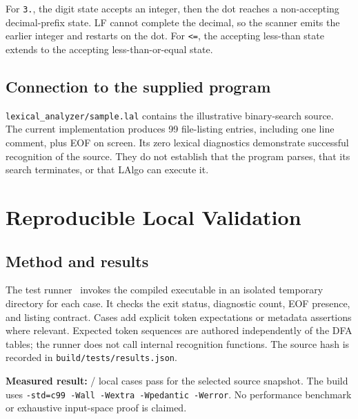 \documentclass[11pt,a4paper]{article}
\newcommand{\code}[1]{\texttt{#1}}
\newcommand{\callout}[1]{\par\smallskip\colorbox{cream}{\parbox{\dimexpr\linewidth-2\fboxsep\relax}{\small #1}}\par\smallskip}
\begin{document}
For \code{3.}, the digit state accepts an integer, then the dot reaches a
non-accepting decimal-prefix state. LF cannot complete the decimal, so the
scanner emits the earlier integer and restarts on the dot. For \code{<=},
the accepting less-than state extends to the accepting less-than-or-equal state.

\subsection{Connection to the supplied program}
\code{lexical\_analyzer/sample.lal} contains the illustrative binary-search
source. The current implementation produces 99 file-listing entries, including
one line comment, plus EOF on screen. Its zero lexical diagnostics demonstrate
successful recognition of the source. They do not establish that the program
parses, that its search terminates, or that LAlgo can execute it.

\clearpage
\section{Reproducible Local Validation}
\subsection{Method and results}
The test runner~\cite{tests} invokes the compiled executable in an isolated
temporary directory for each case. It checks the exit status, diagnostic count,
EOF presence, and listing contract. Cases add explicit token expectations or
metadata assertions where relevant. Expected token sequences are authored
independently of the DFA tables; the runner does not call internal recognition
functions. The source hash is recorded in \code{build/tests/results.json}.

\callout{\textbf{Measured result:} \ValidationPassed{} / \ValidationCases{}
local cases pass for the selected source snapshot. The build uses
\code{-std=c99 -Wall -Wextra -Wpedantic -Werror}. No performance benchmark or
exhaustive input-space proof is claimed.}
\end{document}
